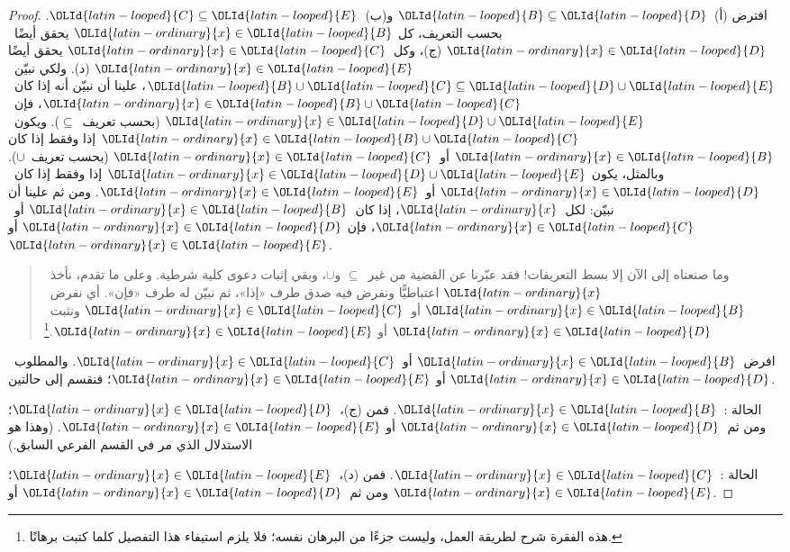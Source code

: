 \documentclass[../../../include/open-logic-section]{subfiles}
\begin{document}
\begin{proof}
  افترض (أ)~$\OLId{latin-looped}{B} \subseteq \OLId{latin-looped}{D}$ و(ب)~$\OLId{latin-looped}{C} \subseteq \OLId{latin-looped}{E}$. بحسب التعريف، كل
  $\OLId{latin-ordinary}{x} \in \OLId{latin-looped}{B}$ يحقق أيضًا~$\OLId{latin-ordinary}{x} \in \OLId{latin-looped}{D}$ (ج)، وكل~$\OLId{latin-ordinary}{x} \in \OLId{latin-looped}{C}$ يحقق أيضًا
  $\OLId{latin-ordinary}{x} \in \OLId{latin-looped}{E}$ (د). ولكي نبيّن~$\OLId{latin-looped}{B} \cup \OLId{latin-looped}{C} \subseteq \OLId{latin-looped}{D} \cup \OLId{latin-looped}{E}$، علينا أن
  نبيّن أنه إذا كان~$\OLId{latin-ordinary}{x} \in \OLId{latin-looped}{B} \cup \OLId{latin-looped}{C}$، فإن~$\OLId{latin-ordinary}{x} \in \OLId{latin-looped}{D} \cup \OLId{latin-looped}{E}$ (بحسب
  تعريف~$\subseteq$). ويكون~$\OLId{latin-ordinary}{x} \in \OLId{latin-looped}{B} \cup \OLId{latin-looped}{C}$ إذا وفقط إذا كان
  $\OLId{latin-ordinary}{x} \in \OLId{latin-looped}{B}$ أو~$\OLId{latin-ordinary}{x} \in \OLId{latin-looped}{C}$ (بحسب تعريف~$\cup$). وبالمثل، يكون
  $\OLId{latin-ordinary}{x} \in \OLId{latin-looped}{D} \cup \OLId{latin-looped}{E}$ إذا وفقط إذا كان~$\OLId{latin-ordinary}{x} \in \OLId{latin-looped}{D}$ أو~$\OLId{latin-ordinary}{x} \in \OLId{latin-looped}{E}$. ومن ثم
  علينا أن نبيّن: لكل~$\OLId{latin-ordinary}{x}$، إذا كان~$\OLId{latin-ordinary}{x} \in \OLId{latin-looped}{B}$ أو~$\OLId{latin-ordinary}{x} \in \OLId{latin-looped}{C}$، فإن
  $\OLId{latin-ordinary}{x} \in \OLId{latin-looped}{D}$ أو~$\OLId{latin-ordinary}{x} \in \OLId{latin-looped}{E}$.

  \begin{quote}
  وما صنعناه إلى الآن إلا بسط التعريفات!{} فقد عبّرنا عن القضية من
  غير~$\subseteq$ و$\cup$، وبقي إثبات دعوى كلية شرطية. وعلى ما تقدم،
  نأخذ~$\OLId{latin-ordinary}{x}$ اعتباطيًّا ونفرض فيه صدق طرف «إذا»، ثم نبيّن له طرف «فإن».
  أي نفرض~$\OLId{latin-ordinary}{x} \in \OLId{latin-looped}{B}$ أو~$\OLId{latin-ordinary}{x} \in \OLId{latin-looped}{C}$ ونثبت~$\OLId{latin-ordinary}{x} \in \OLId{latin-looped}{D}$ أو
  $\OLId{latin-ordinary}{x} \in \OLId{latin-looped}{E}$.\footnote{هذه الفقرة شرح لطريقة العمل، وليست جزءًا من
  البرهان نفسه؛ فلا يلزم استيفاء هذا التفصيل كلما كتبت برهانًا.}
  \end{quote}

  افرض~$\OLId{latin-ordinary}{x} \in \OLId{latin-looped}{B}$ أو~$\OLId{latin-ordinary}{x} \in \OLId{latin-looped}{C}$. والمطلوب~$\OLId{latin-ordinary}{x} \in \OLId{latin-looped}{D}$ أو
  $\OLId{latin-ordinary}{x} \in \OLId{latin-looped}{E}$؛ فنقسم إلى حالتين.

  الحالة :~$\OLId{latin-ordinary}{x} \in \OLId{latin-looped}{B}$. فمن (ج)،~$\OLId{latin-ordinary}{x} \in \OLId{latin-looped}{D}$؛ ومن ثم~$\OLId{latin-ordinary}{x} \in \OLId{latin-looped}{D}$ أو
  $\OLId{latin-ordinary}{x} \in \OLId{latin-looped}{E}$. (وهذا هو الاستدلال الذي مر في القسم الفرعي السابق.)

  الحالة :~$\OLId{latin-ordinary}{x} \in \OLId{latin-looped}{C}$. فمن (د)،~$\OLId{latin-ordinary}{x} \in \OLId{latin-looped}{E}$؛ ومن ثم~$\OLId{latin-ordinary}{x} \in \OLId{latin-looped}{D}$ أو
  $\OLId{latin-ordinary}{x} \in \OLId{latin-looped}{E}$.
 \end{proof}
\end{document}
